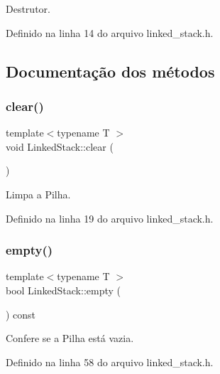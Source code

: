 Destrutor. 



Definido na linha 14 do arquivo linked\+\_\+stack.\+h.



\subsection{Documentação dos métodos}
\mbox{\label{classstructures_1_1_linked_stack_ac0491cef165f5beb3a00a4979aa8c349}} 
\subsubsection{\texorpdfstring{clear()}{clear()}}
{\footnotesize\ttfamily template$<$typename T $>$ \\
void Linked\+Stack\+::clear (\begin{DoxyParamCaption}{ }\end{DoxyParamCaption})}



Limpa a Pilha. 



Definido na linha 19 do arquivo linked\+\_\+stack.\+h.

\mbox{\label{classstructures_1_1_linked_stack_a42b81c0a1c2e0ab6ef2e0fe04a584001}} 
\subsubsection{\texorpdfstring{empty()}{empty()}}
{\footnotesize\ttfamily template$<$typename T $>$ \\
bool Linked\+Stack\+::empty (\begin{DoxyParamCaption}{ }\end{DoxyParamCaption}) const}



Confere se a Pilha está vazia. 



Definido na linha 58 do arquivo linked\+\_\+stack.\+h.



